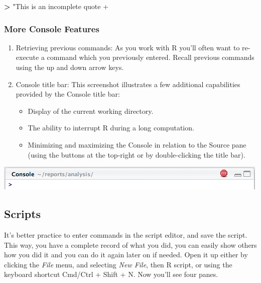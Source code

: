 \documentclass[]{book}
\newenvironment{Shaded}{\begin{snugshade}}{\end{snugshade}}
\newcommand{\StringTok}[1]{\textcolor[rgb]{0.31,0.60,0.02}{#1}}
\newcommand{\OperatorTok}[1]{\textcolor[rgb]{0.81,0.36,0.00}{\textbf{#1}}}
\providecommand{\tightlist}{%
  \setlength{\itemsep}{0pt}\setlength{\parskip}{0pt}}
\begin{document}
\begin{Shaded}
\begin{Highlighting}[]
\OperatorTok{>}\StringTok{ "This is an incomplete quote}
\StringTok{+}
\end{Highlighting}
\end{Shaded}

\subsubsection*{More Console Features}\label{more-console-features}

\begin{enumerate}
\def\labelenumi{\arabic{enumi}.}
\item
  Retrieving previous commands: As you work with R you'll often want to
  re-execute a command which you previously entered. Recall previous
  commands using the up and down arrow keys.
\item
  Console title bar: This screenshot illustrates a few additional
  capabilities provided by the Console title bar:

  \begin{itemize}
  \tightlist
  \item
    Display of the current working directory.
  \item
    The ability to interrupt R during a long computation.
  \item
    Minimizing and maximizing the Console in relation to the Source pane
    (using the buttons at the top-right or by double-clicking the title
    bar).
  \end{itemize}
\end{enumerate}

\begin{center}\includegraphics[width=0.7\linewidth]{img/using_console_title_bar} \end{center}

\subsection{Scripts}\label{scripts}

It's better practice to enter commands in the script editor, and save
the script. This way, you have a complete record of what you did, you
can easily show others how you did it and you can do it again later on
if needed. Open it up either by clicking the \emph{File} menu, and
selecting \emph{New File}, then R script, or using the keyboard shortcut
Cmd/Ctrl + Shift + N. Now you'll see four panes.
\end{document}
